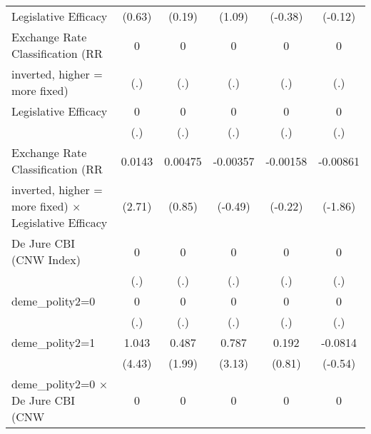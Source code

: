 {\begin{tabular}{l*{5}{c}}
Legislative Efficacy                    &    (0.63)         &    (0.19)         &    (1.09)         &   (-0.38)         &   (-0.12)         \\
\addlinespace
Exchange Rate Classification (RR        &         0         &         0         &         0         &         0         &         0         \\
inverted, higher = more fixed)          &       (.)         &       (.)         &       (.)         &       (.)         &       (.)         \\
\addlinespace
Legislative Efficacy                    &         0         &         0         &         0         &         0         &         0         \\
                                        &       (.)         &       (.)         &       (.)         &       (.)         &       (.)         \\
\addlinespace
Exchange Rate Classification (RR        &    0.0143\sym{**} &   0.00475         &  -0.00357         &  -0.00158         &  -0.00861         \\
inverted, higher = more fixed) $\times$ Legislative Efficacy&    (2.71)         &    (0.85)         &   (-0.49)         &   (-0.22)         &   (-1.86)         \\
\addlinespace
De Jure CBI (CNW Index)                 &         0         &         0         &         0         &         0         &         0         \\
                                        &       (.)         &       (.)         &       (.)         &       (.)         &       (.)         \\
\addlinespace
deme\_polity2=0                          &         0         &         0         &         0         &         0         &         0         \\
                                        &       (.)         &       (.)         &       (.)         &       (.)         &       (.)         \\
\addlinespace
deme\_polity2=1                          &     1.043\sym{***}&     0.487\sym{*}  &     0.787\sym{**} &     0.192         &   -0.0814         \\
                                        &    (4.43)         &    (1.99)         &    (3.13)         &    (0.81)         &   (-0.54)         \\
\addlinespace
deme\_polity2=0 $\times$ De Jure CBI (CNW&         0         &         0         &         0         &         0         &         0         \\

\end{tabular}}
